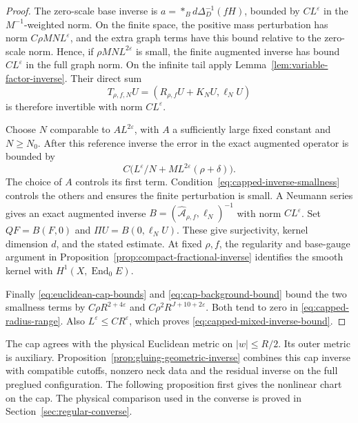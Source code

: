 \documentclass[11pt]{amsart}
\theoremstyle{definition}
\theoremstyle{remark}
\theoremstyle{plain}
\newcommand{\End}{\operatorname{End}}
\begin{document}
\begin{proof}
The zero-scale base inverse is $a=*_Bd\Delta_D^{-1}(fH)$,
bounded by $CL^\varepsilon$ in the $M^{-1}$-weighted norm.
On the finite space, the positive mass perturbation has norm
$C\rho MN L^\varepsilon$, and the extra graph terms have this
bound relative to the zero-scale norm. Hence, if
$\rho MN L^{2\varepsilon}$ is small, the finite augmented
inverse has bound $CL^\varepsilon$ in the full graph norm.
On the infinite tail apply Lemma~\ref{lem:variable-factor-inverse}.
Their direct sum
\[
 T_{\rho,f,N}U=(R_{\rho,f}U+K_NU,\ell_NU)
\]
is therefore invertible with norm $CL^\varepsilon$.

Choose $N$ comparable to $A L^{2\varepsilon}$, with $A$ a
sufficiently large fixed constant and $N\geq N_0$. After this
reference inverse the error in the exact augmented operator is
bounded by
\[
 C\bigl(L^\varepsilon/N+ML^{2\varepsilon}(\rho+\delta)\bigr).
\]
The choice of $A$ controls its first term.
Condition~\eqref{eq:capped-inverse-smallness} controls the others
and ensures the finite perturbation is small. A Neumann series
gives an exact augmented inverse $B=(\widehat{\mathcal A}_{\rho,f},
\ell_N)^{-1}$ with norm $CL^\varepsilon$. Set
$QF=B(F,0)$ and $\Pi U=B(0,\ell_NU)$. These give surjectivity,
kernel dimension $d$, and the stated estimate. At fixed $\rho,f$,
the regularity and base-gauge argument in
Proposition~\ref{prop:compact-fractional-inverse} identifies the
smooth kernel with $H^1(X,\End_0E)$.

Finally \eqref{eq:euclidean-cap-bounds} and
\eqref{eq:cap-background-bound} bound the two smallness terms
by $C\rho R^{2+4\varepsilon}$ and
$C\rho^2R^{J+10+2\varepsilon}$. Both tend to zero in
\eqref{eq:capped-radius-range}. Also $L^\varepsilon\leq CR^\varepsilon$,
which proves \eqref{eq:capped-mixed-inverse-bound}.
\end{proof}

The cap agrees with the physical Euclidean metric on $|w|\leq R/2$.
Its outer metric is auxiliary. Proposition~\ref{prop:gluing-geometric-inverse}
combines this cap inverse with compatible cutoffs, nonzero neck
data and the residual inverse on the full preglued configuration.
The following proposition first gives the nonlinear chart on
the cap. The physical comparison used in the converse is proved
in Section~\ref{sec:regular-converse}.
\end{document}
